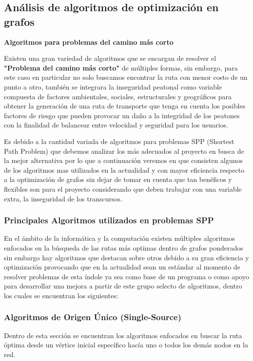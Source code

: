 \newpage

\subsection{Análisis de algoritmos de optimización en grafos}

\textbf{Algoritmos para problemas del camino más corto} \\
\label{AgSPP}

Existen una gran variedad de algoritmos que se encargan de resolver el \textbf{"Problema del camino más corto"} de múltiples formas, sin embargo, para este caso en particular no solo buscamos encontrar la ruta con menor costo de un punto a otro, también se integrara la inseguridad peatonal como variable compuesta de factores ambientales, sociales, estructurales y geográficos para obtener la generación de una ruta de transporte que tenga en cuenta los posibles factores de riesgo que pueden provocar un daño a la integridad de los peatones con la finalidad de balancear entre velocidad y seguridad para los usuarios. 

Es debido a la cantidad variada de algoritmos para problemas SPP (Shortest Path Problem) que debemos analizar los más adecuados al proyecto en busca de la mejor alternativa por lo que a continuación veremos en que consisten algunos de los algoritmos mas utilizados en la actualidad y con mayor eficiencia respecto a la optimización de grafos sin dejar de tomar en cuenta que tan benéficos y flexibles son para el proyecto considerando que deben trabajar con una variable extra, la inseguridad de los transcursos.

\subsubsection{Principales Algoritmos utilizados en problemas SPP}

En el ámbito de la informática y la computación existen múltiples algoritmos enfocados en la búsqueda de las rutas más optimas dentro de grafos ponderados sin embargo hay algoritmos que destacan sobre otros debido a su gran eficiencia y optimización provocando que en la actualidad sean un estándar al momento de resolver problemas de esta índole ya sea como base de un programa o como apoyo para desarrollar una mejora a partir de este grupo selecto de algoritmos, dentro los cuales se encuentran los siguientes: 

\subsubsection{Algoritmos de Origen Único (Single-Source)}
Dentro de esta sección se encuentran los algoritmos enfocados en buscar la ruta óptima desde un vértice inicial específico hacía uno o todos los demás nodos en la red. 

